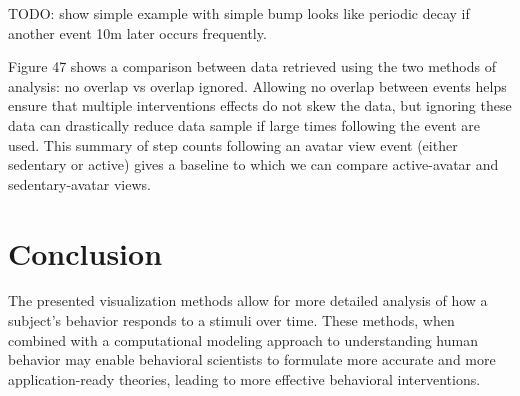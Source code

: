 \documentclass[review,journal]{vgtc}         %
\begin{document}
TODO: show simple example with simple bump looks like periodic decay if another event 10m later occurs frequently.

Figure 47 shows a comparison between data retrieved using the two methods of analysis: no overlap vs overlap ignored.
Allowing no overlap between events helps ensure that multiple interventions effects do not skew the data, but ignoring these data can drastically reduce data sample if large times following the event are used.
This summary of step counts following an avatar view event (either sedentary or active) gives a baseline to which we can compare active-avatar and sedentary-avatar views.


\section{Conclusion}
The presented visualization methods allow for more detailed analysis of how a subject’s behavior responds to a stimuli over time.
These methods, when combined with a computational modeling approach to understanding human behavior may enable behavioral scientists to formulate more accurate and more application-ready theories, leading to more effective behavioral interventions.




\end{document}
